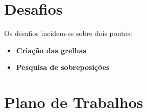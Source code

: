 \section {Desafios}
Os desafios incidem-se sobre dois pontos:
\begin{itemize}
\item{\textbf{Criação das grelhas}}
\item{\textbf{Pesquisa de sobreposições}}
\end{itemize}
\section{Plano de Trabalhos} %
\label{sec:dealing_with_bibliogrpahy}



%
%
%




